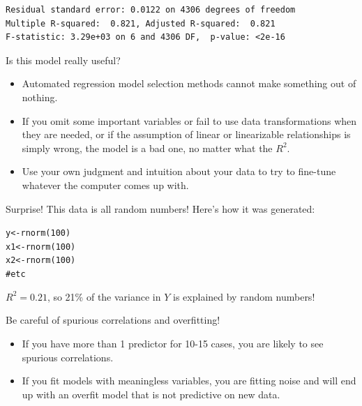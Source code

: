 \documentclass{beamer}\usepackage[]{graphicx}\usepackage[]{color}
\makeatletter
\newcommand{\hlnum}[1]{\textcolor[rgb]{0.824,0.412,0.118}{#1}}%
\newcommand{\hlcom}[1]{\textcolor[rgb]{0.824,0.706,0.549}{#1}}%
\newcommand{\hlstd}[1]{\textcolor[rgb]{1,0.894,0.769}{#1}}%
\newcommand{\hlkwb}[1]{\textcolor[rgb]{0.804,0.776,0.451}{#1}}%
\newcommand{\hlkwd}[1]{\textcolor[rgb]{1,0.78,0.769}{#1}}%
\newenvironment{kframe}{%
 \def\at@end@of@kframe{}%
 \ifinner\ifhmode%
  \def\at@end@of@kframe{\end{minipage}}%
  \begin{minipage}{\columnwidth}%
 \fi\fi%
 \def\FrameCommand##1{\hskip\@totalleftmargin \hskip-\fboxsep
 \colorbox{shadecolor}{##1}\hskip-\fboxsep
     \hskip-\linewidth \hskip-\@totalleftmargin \hskip\columnwidth}%
 \MakeFramed {\advance\hsize-\width
   \@totalleftmargin\z@ \linewidth\hsize
   \@setminipage}}%
 {\par\unskip\endMakeFramed%
 \at@end@of@kframe}
\newenvironment{knitrout}{}{} %
\makeatother
\begin{document}
\begin{darkframes}
\begin{frame}[fragile]
\begin{knitrout}
\begin{kframe}
\begin{verbatim}
Residual standard error: 0.0122 on 4306 degrees of freedom
Multiple R-squared:  0.821,	Adjusted R-squared:  0.821 
F-statistic: 3.29e+03 on 6 and 4306 DF,  p-value: <2e-16
\end{verbatim}
\end{kframe}
\end{knitrout}
      \lc %
      \lc %
    \end{frame}

    \begin{frame}[fragile]{Is this model really useful?}
      \begin{itemize}[<+->]
        \item Automated regression model selection methods cannot make something out of nothing. 
        \item If you omit some important variables or fail to use data transformations when they are needed, or if the assumption of linear or linearizable relationships is simply wrong, the model is a bad one, no matter what the $R^2$.  
        \item Use your own judgment and intuition about your data to try to fine-tune whatever the computer comes up with.
      \end{itemize} 
    \end{frame}

    \begin{frame}[fragile]{Surprise!}
      This data is all random numbers! Here's how it was generated:

\begin{knitrout}
\begin{kframe}
\begin{alltt}
\hlstd{y} \hlkwb{<-} \hlkwd{rnorm}\hlstd{(}\hlnum{100}\hlstd{)}
\hlstd{x1} \hlkwb{<-} \hlkwd{rnorm}\hlstd{(}\hlnum{100}\hlstd{)}
\hlstd{x2} \hlkwb{<-} \hlkwd{rnorm}\hlstd{(}\hlnum{100}\hlstd{)}
\hlcom{# etc}
\end{alltt}
\end{kframe}
\end{knitrout}

      $R^2=0.21$, so 21\% of the variance in $Y$ is explained by random numbers!  
      \lc %
    \end{frame}

    \begin{frame}[fragile]{Be careful of spurious correlations and overfitting!}
      \begin{itemize}
        \item If you have more than 1 predictor for 10-15 cases, you are likely to see spurious correlations.
        \item If you fit models with meaningless variables, you are fitting noise and will end up with an \alert{overfit} model that is not predictive on new data. 
      \end{itemize} 
    \end{frame}


\end{darkframes}
\end{document}
